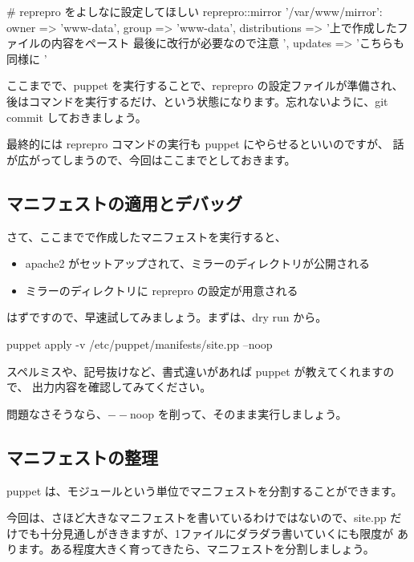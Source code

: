 \documentclass[mingoth,a4paper]{jsarticle}
\begin{document}
\begin{commandline}
# reprepro をよしなに設定してほしい
reprepro::mirror { '/var/www/mirror':
  owner => 'www-data', group => 'www-data',
  distributions => '上で作成したファイルの内容をペースト
最後に改行が必要なので注意
',
  updates       => 'こちらも同様に
'
}
\end{commandline}

ここまでで、puppet を実行することで、reprepro の設定ファイルが準備され、
後はコマンドを実行するだけ、という状態になります。忘れないように、git commit
しておきましょう。

最終的には reprepro コマンドの実行も puppet にやらせるといいのですが、
話が広がってしまうので、今回はここまでとしておきます。

\subsection{マニフェストの適用とデバッグ}

さて、ここまでで作成したマニフェストを実行すると、

\begin{itemize}
\item apache2 がセットアップされて、ミラーのディレクトリが公開される
\item ミラーのディレクトリに reprepro の設定が用意される
\end{itemize}

はずですので、早速試してみましょう。まずは、dry run から。

\begin{commandline}
puppet apply -v /etc/puppet/manifests/site.pp --noop
\end{commandline}

スペルミスや、記号抜けなど、書式違いがあれば puppet が教えてくれますので、
出力内容を確認してみてください。

問題なさそうなら、$--$noop を削って、そのまま実行しましょう。

\subsection{マニフェストの整理}

puppet は、モジュールという単位でマニフェストを分割することができます。

今回は、さほど大きなマニフェストを書いているわけではないので、site.pp
だけでも十分見通しがききますが、1ファイルにダラダラ書いていくにも限度が
あります。ある程度大きく育ってきたら、マニフェストを分割しましょう。
\end{document}
